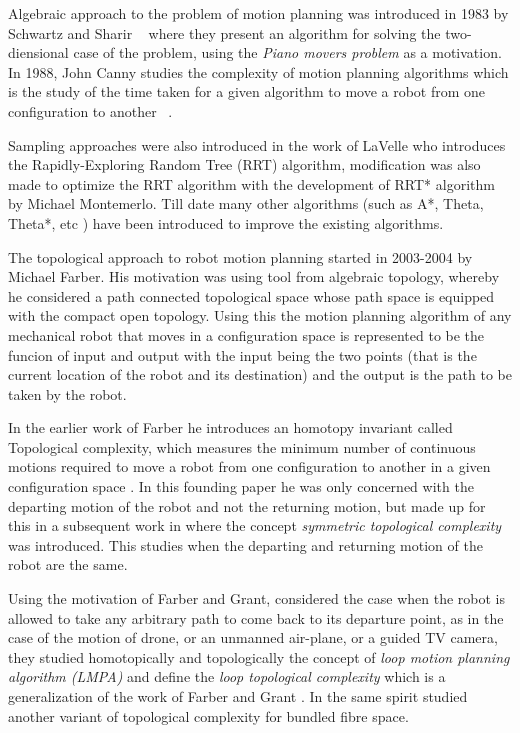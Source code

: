 Algebraic approach to the problem of motion planning was introduced in 1983 by Schwartz and Sharir ~\cite{schwartz:1983a} where they present an algorithm for solving the two-diensional case of the problem, using the \textit{Piano movers problem} as a motivation. In 1988, John Canny studies the complexity of motion planning algorithms which is the study of the time taken for a given algorithm to move a robot from one configuration to another ~\cite{canny1988}. 

Sampling approaches were also introduced in the work of LaVelle who introduces the Rapidly-Exploring Random Tree (RRT) algorithm, modification was also made to optimize the RRT algorithm with the development of RRT* algorithm by Michael Montemerlo. Till date many other algorithms (such as A*, Theta, Theta*, etc ) have been introduced to improve the existing algorithms.

The topological approach to robot motion planning started in 2003-2004 by Michael Farber. His motivation was using tool from algebraic topology, whereby he considered a path connected topological space whose path space is equipped with the compact open topology. Using this the motion planning algorithm of any mechanical robot that moves in a configuration space is represented to be the funcion of input and output with the input being the two points (that is the current location of the robot and its destination) and the output is the path to be taken by the robot.

In the earlier work of Farber he introduces an homotopy invariant called Topological complexity, which measures the minimum number of continuous motions required to move a robot from one configuration to another in a given configuration space \cite{farber2003topological}. In this founding paper he was only concerned with the departing motion of the robot and not the returning motion, but made up for this in a subsequent work in \cite{farber2007symmetric} where the concept \textit{symmetric topological complexity} was introduced. This studies when the departing and returning motion of the robot are the same.

Using the motivation of Farber and Grant,\cite{derfoufi2015loop} considered the case when the robot is allowed to take any arbitrary path to come back to its departure point, as in the case of the motion of drone, or an unmanned air-plane, or a guided TV camera, they studied homotopically and topologically the concept of \textit{loop motion planning algorithm (LMPA)}  and define the \textit{loop topological complexity} which is a generalization of the work of Farber and Grant \cite{mamouni2022pure}. In the same spirit \cite{rami2018variant} studied another variant of topological complexity for bundled fibre space.

